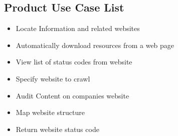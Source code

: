 \documentclass[titlepage]{article}
\begin{document}
\subsection*{Product Use Case List  }
\begin{itemize}
  \item Locate Information and related websites
  \item Automatically download resources from a web page
  \item View list of status codes from website 
  \item Specify website to crawl
  \item Audit Content on companies website 
  \item Map website structure
  \item Return website status code
\end{itemize}
\end{document}
